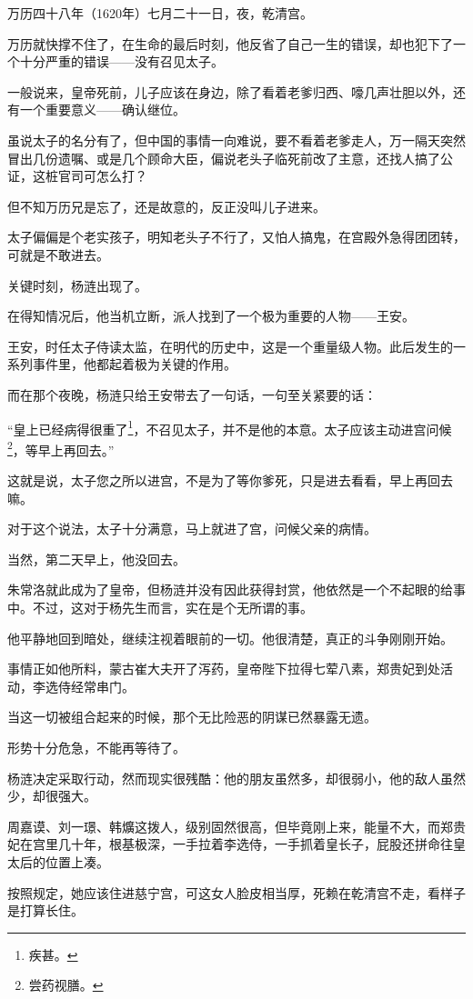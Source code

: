 \begin{multicols}{\theparacolNo}
万历四十八年（1620年）七月二十一日，夜，乾清宫。

万历就快撑不住了，在生命的最后时刻，他反省了自己一生的错误，却也犯下了一个十分严重的错误——没有召见太子。

一般说来，皇帝死前，儿子应该在身边，除了看着老爹归西、嚎几声壮胆以外，还有一个重要意义——确认继位。

虽说太子的名分有了，但中国的事情一向难说，要不看着老爹走人，万一隔天突然冒出几份遗嘱、或是几个顾命大臣，偏说老头子临死前改了主意，还找人搞了公证，这桩官司可怎么打？

但不知万历兄是忘了，还是故意的，反正没叫儿子进来。

太子偏偏是个老实孩子，明知老头子不行了，又怕人搞鬼，在宫殿外急得团团转，可就是不敢进去。

关键时刻，杨涟出现了。

在得知情况后，他当机立断，派人找到了一个极为重要的人物——王安。

王安，时任太子侍读太监，在明代的历史中，这是一个重量级人物。此后发生的一系列事件里，他都起着极为关键的作用。

而在那个夜晚，杨涟只给王安带去了一句话，一句至关紧要的话：

“皇上已经病得很重了\footnote{疾甚。}，不召见太子，并不是他的本意。太子应该主动进宫问候\footnote{尝药视膳。}，等早上再回去。”

这就是说，太子您之所以进宫，不是为了等你爹死，只是进去看看，早上再回去嘛。

对于这个说法，太子十分满意，马上就进了宫，问候父亲的病情。

当然，第二天早上，他没回去。

朱常洛就此成为了皇帝，但杨涟并没有因此获得封赏，他依然是一个不起眼的给事中。不过，这对于杨先生而言，实在是个无所谓的事。

他平静地回到暗处，继续注视着眼前的一切。他很清楚，真正的斗争刚刚开始。

事情正如他所料，蒙古崔大夫开了泻药，皇帝陛下拉得七荤八素，郑贵妃到处活动，李选侍经常串门。

当这一切被组合起来的时候，那个无比险恶的阴谋已然暴露无遗。

形势十分危急，不能再等待了。

杨涟决定采取行动，然而现实很残酷：他的朋友虽然多，却很弱小，他的敌人虽然少，却很强大。

周嘉谟、刘一璟、韩爌这拨人，级别固然很高，但毕竟刚上来，能量不大，而郑贵妃在宫里几十年，根基极深，一手拉着李选侍，一手抓着皇长子，屁股还拼命往皇太后的位置上凑。

按照规定，她应该住进慈宁宫，可这女人脸皮相当厚，死赖在乾清宫不走，看样子是打算长住。


\end{multicols}
